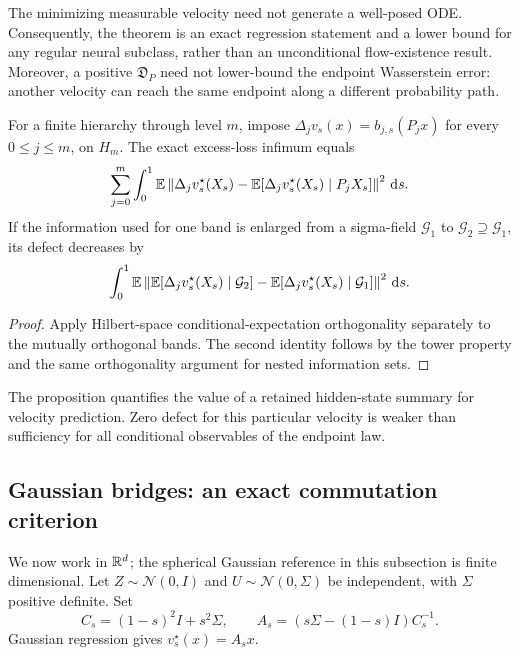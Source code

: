 The minimizing measurable velocity need not generate a well-posed ODE. Consequently, the theorem is an exact regression statement and a lower bound for any regular neural subclass, rather than an unconditional flow-existence result. Moreover, a positive $\mathfrak D_P$ need not lower-bound the endpoint Wasserstein error: another velocity can reach the same endpoint along a different probability path.

\begin{proposition}\label{prop:hierarchy-defect}
For a finite hierarchy through level $m$, impose
$\Delta_jv_s(x)=b_{j,s}(P_jx)$ for every $0\le j\le m$, on $H_m$. The exact excess-loss infimum equals
\begin{equation}\label{eq:hierarchy-defect}
 \sum_{j=0}^m\int_0^1\mathbb E\left\lVert
 \Delta_jv_s^\star(X_s)-\mathbb E[\Delta_jv_s^\star(X_s)\mid P_jX_s]\right\rVert^2\,\mathrm d s.
\end{equation}
If the information used for one band is enlarged from a sigma-field $\mathcal G_1$ to $\mathcal G_2\supseteq\mathcal G_1$, its defect decreases by
\begin{equation}
 \int_0^1\mathbb E\left\lVert\mathbb E[\Delta_jv_s^\star(X_s)\mid\mathcal G_2]
 -\mathbb E[\Delta_jv_s^\star(X_s)\mid\mathcal G_1]\right\rVert^2\,\mathrm d s.
\end{equation}
\end{proposition}
\begin{proof}
Apply Hilbert-space conditional-expectation orthogonality separately to the mutually orthogonal bands. The second identity follows by the tower property and the same orthogonality argument for nested information sets.
\end{proof}
The proposition quantifies the value of a retained hidden-state summary for velocity prediction. Zero defect for this particular velocity is weaker than sufficiency for all conditional observables of the endpoint law.

\subsection{Gaussian bridges: an exact commutation criterion}
We now work in $\mathbb R^d$; the spherical Gaussian reference in this subsection is finite dimensional. Let $Z\sim\mathcal N(0,I)$ and $U\sim\mathcal N(0,\Sigma)$ be independent, with $\Sigma$ positive definite. Set
\begin{equation}\label{eq:gaussian-velocity}
 C_s=(1-s)^2I+s^2\Sigma,\qquad
 A_s=(s\Sigma-(1-s)I)C_s^{-1}.
\end{equation}
Gaussian regression gives $v_s^\star(x)=A_sx$.

